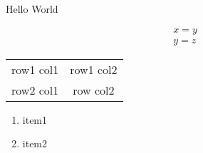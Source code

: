 \documentclass[]{article}
\begin{document}
\begin{center} Hello World \end{center}
\begin{align*} x = y\\ y = z \end{align*}

\begin{tabular}[]{cc}
  row1 col1 & row1 col2 \\
  row2 col1 & row col2
\end{tabular}

\begin{enumerate}
  \item item1
  \item item2
\end{enumerate}
\end{document}
